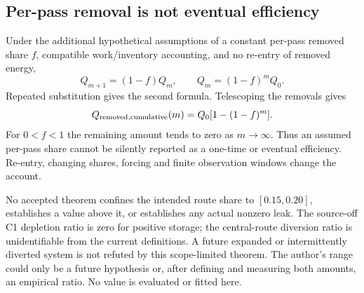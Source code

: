 \subsection{Per-pass removal is not eventual efficiency}\label{sec:compounding}
Under the additional hypothetical assumptions of a constant per-pass removed share $f$, compatible work/inventory accounting, and no re-entry of removed energy,
\begin{equation}\label{eq:perpass}
 Q_{m+1}=(1-f)Q_m,\qquad Q_m=(1-f)^mQ_0.
\end{equation}
Repeated substitution gives the second formula. Telescoping the removals gives
\begin{equation}\label{eq:cumulative}
 Q_{\rm removed,cumulative}(m)=Q_0[1-(1-f)^m].
\end{equation}
For $0<f<1$ the remaining amount tends to zero as $m\to\infty$. Thus an assumed per-pass share cannot be silently reported as a one-time or eventual efficiency. Re-entry, changing shares, forcing and finite observation windows change the account.

No accepted theorem confines the intended route share to $[0.15,0.20]$, establishes a value above it, or establishes any actual nonzero leak. The source-off C1 depletion ratio is zero for positive storage; the central-route diversion ratio is unidentifiable from the current definitions. A future expanded or intermittently diverted system is not refuted by this scope-limited theorem. The author's range could only be a future hypothesis or, after defining and measuring both amounts, an empirical ratio. No value is evaluated or fitted here.
